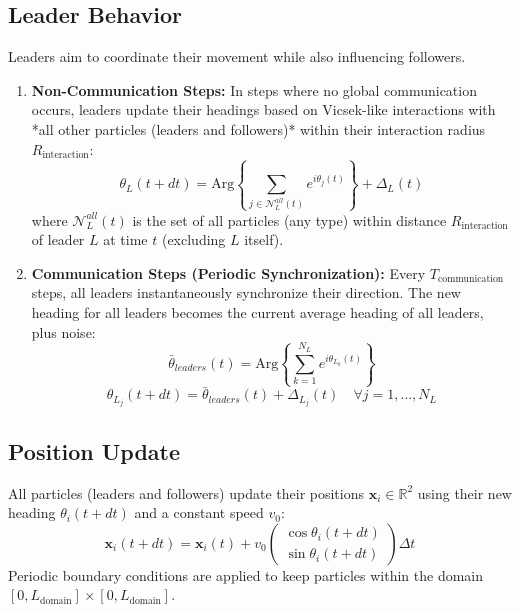 \documentclass[11pt]{article}
\begin{document}
\subsection{Leader Behavior}
Leaders aim to coordinate their movement while also influencing followers.
\begin{enumerate}
    \item \textbf{Non-Communication Steps:} In steps where no global communication occurs, leaders update their headings based on Vicsek-like interactions with *all other particles (leaders and followers)* within their interaction radius $R_{\text{interaction}}$:
    \begin{equation}
        \theta_L(t+dt) = \mathrm{Arg}\!\left\{\sum_{j \in \mathcal{N}_L^{all}(t)} e^{i\theta_j(t)}\right\} + \Delta_L(t)
    \end{equation}
    where $\mathcal{N}_L^{all}(t)$ is the set of all particles (any type) within distance $R_{\text{interaction}}$ of leader $L$ at time $t$ (excluding $L$ itself).
    \item \textbf{Communication Steps (Periodic Synchronization):} Every $T_{\text{communication}}$ steps, all leaders instantaneously synchronize their direction. The new heading for all leaders becomes the current average heading of all leaders, plus noise:
    \begin{equation}
        \bar{\theta}_{leaders}(t) = \mathrm{Arg}\!\left\{\sum_{k=1}^{N_L} e^{i\theta_{L_k}(t)}\right\}
    \end{equation}
    \begin{equation}
        \theta_{L_j}(t+dt) = \bar{\theta}_{leaders}(t) + \Delta_{L_j}(t) \quad \forall j=1, \dots, N_L
    \end{equation}
\end{enumerate}

\subsection{Position Update}
All particles (leaders and followers) update their positions $\mathbf{x}_i \in \mathbb{R}^2$ using their new heading $\theta_i(t+dt)$ and a constant speed $v_0$:
\begin{equation}
    \mathbf{x}_i(t+dt) = \mathbf{x}_i(t) + v_0 \begin{pmatrix} \cos\theta_i(t+dt) \\ \sin\theta_i(t+dt) \end{pmatrix} \Delta t
\end{equation}
Periodic boundary conditions are applied to keep particles within the domain $[0, L_{\text{domain}}] \times [0, L_{\text{domain}}]$.
\end{document}
